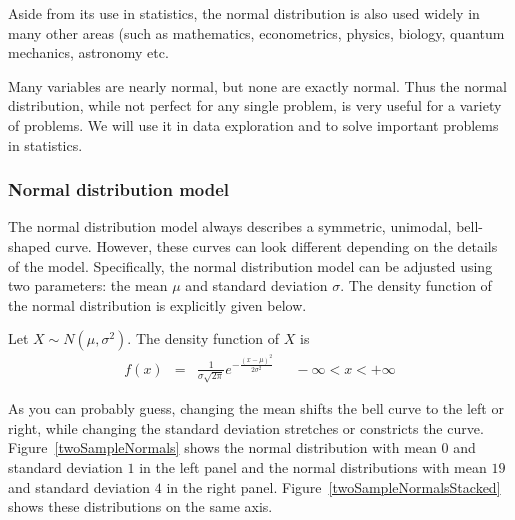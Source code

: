 Aside from its use in statistics, the normal distribution is also used widely in many other areas (such as mathematics, econometrics, physics, biology, quantum mechanics, astronomy etc.


\begin{termBox}{
Many variables are nearly normal, but none are exactly normal. Thus the normal distribution, while not perfect for any single problem, is very useful for a variety of problems. We will use it in data exploration and to solve important problems in statistics.\vspace{0.7mm}}
\end{termBox}





\subsubsection{Normal distribution model}\label{normalDistributionModel}

The normal distribution model always describes a symmetric, unimodal, bell-shaped curve. However, these curves can look different depending on the details of the model. Specifically, the normal distribution model can be adjusted using two parameters: the mean $\mu$ and standard deviation $\sigma$. 
The density function of the normal distribution is explicitly given below.


\begin{termBox}{ 
Let $X \sim N(\mu, \sigma^{2})$.
The density function of $X$ is 
\begin{eqnarray}
f(x) & = &\displaystyle\frac{1}{ \sigma \sqrt{2 \pi} } e^{ -\frac{ (x - \mu)^{2} }{ 2 \sigma^{2}}  }	 	~\quad~	-\infty < x < +\infty	\label{normalDensity}
\end{eqnarray}
}
\end{termBox}


As you can probably guess, changing the mean shifts the bell curve to the left or right, while changing the standard deviation stretches or constricts the curve. Figure~\ref{twoSampleNormals} shows the normal distribution with mean $0$ and standard deviation $1$ in the left panel and the normal distributions with mean $19$ and standard deviation $4$ in the right panel. Figure~\ref{twoSampleNormalsStacked} shows these distributions on the same axis.

